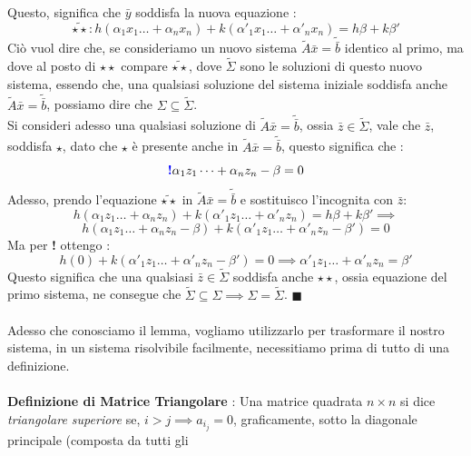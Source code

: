 \documentclass[12pt, letterpaper]{article}
\newcommand{\acc}{\\\hphantom{}\\}
\begin{document}
Questo, significa che \(\bar y\) soddisfa la nuova equazione : \begin{equation}
    \tilde{\star\star} : h(\alpha_1x_1\dots+\alpha_nx_n)+k(\alpha'_1x_1\dots+\alpha'_nx_n)=h\beta+k\beta'
\end{equation}
Ciò vuol dire che, se consideriamo un nuovo sistema \(\tilde A\bar x = \tilde{\bar b}\) identico al primo, ma dove 
al posto di \(\star\star\) compare \(\tilde{\star\star}\), dove \(\tilde\Sigma\) sono le soluzioni di questo nuovo 
sistema, essendo che, una qualsiasi soluzione del sistema 
iniziale  soddisfa anche \(\tilde A\bar x = \tilde{\bar b}\), possiamo dire che \(\Sigma\subseteq\tilde\Sigma\).\\
Si consideri adesso una qualsiasi soluzione di \(\tilde A\bar x = \tilde{\bar b}\), ossia \(\bar z \in \tilde\Sigma\), vale 
che \(\bar z\), soddisfa \(\star\), dato che \(\star\) è presente anche in \(\tilde A\bar x = \tilde{\bar b}\), questo 
significa che : \begin{equation}
    \text{\color{blue}\textbf{!}\color{black} }\alpha_1z_1\dots+\alpha_nz_n-\beta=0
\end{equation}
Adesso, prendo l'equazione \(\tilde{\star\star}\) in \(\tilde A\bar x = \tilde{\bar b}\) e sostituisco l'incognita con \(\bar z\):
\begin{equation}
    h(\alpha_1z_1\dots+\alpha_nz_n)+k(\alpha'_1z_1\dots+\alpha'_nz_n)=h\beta+k\beta'\implies
\end{equation}
\begin{equation}
    h(\alpha_1z_1\dots+\alpha_nz_n-\beta)+k(\alpha'_1z_1\dots+\alpha'_nz_n-\beta')=0
\end{equation}
Ma per \color{blue}\textbf{! }\color{black} ottengo : 
\begin{equation}
    h(0)+k(\alpha'_1z_1\dots+\alpha'_nz_n-\beta')=0\implies \alpha'_1z_1\dots+\alpha'_nz_n=\beta'
\end{equation}
Questo significa che una qualsiasi \(\bar z\in \tilde\Sigma\) soddisfa anche \(\star\star\), ossia equazione del primo sistema, 
ne consegue che \(\tilde\Sigma\subseteq\Sigma\implies \Sigma=\tilde\Sigma\). \(\blacksquare\)\acc
Adesso che conosciamo il lemma, vogliamo utilizzarlo per trasformare il nostro sistema, in un sistema risolvibile 
facilmente, necessitiamo prima di tutto di una definizione. \acc 
\textbf{Definizione di Matrice Triangolare }: Una matrice quadrata \(n\times n\) si dice \textit{triangolare 
superiore} se, \(i>j\implies a_{i_j}=0\), graficamente, sotto la diagonale principale (composta da tutti gli 
\end{document}
